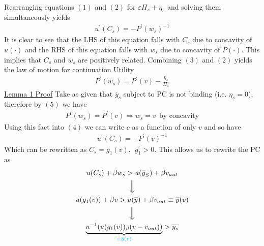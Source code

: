 \documentclass{article}
\begin{document}
\begin{itemize}
\begin{itemize}
\begin{itemize}
\begin{itemize}
\begin{align*}
                \end{align*}
                Rearranging equations $(1)$ and $(2)$ for $\varepsilon \Pi_{s} + \eta_{s}$ and solving them simultaneously yields
                \begin{align*}
                    u^{'}(C_{s}) = - P^{'}(w_{s})^{-1} \tag{(4)}
                \end{align*}
                It is clear to see that the LHS of this equation falls with $C_{s}$ due to concavity of $u(\cdot)$ and the RHS of this equation falls with $w_{s}$ due to concavity of $P(\cdot)$. This implies that $C_{s}$ and $w_{s}$ are positively related.
                \newline
                Combining $(3)$ and $(2)$ yields the law of motion for continuation Utility
                \begin{align*}
                    P^{'}(w_{s}) = P^{'}(v) - \frac{\eta_{s}}{\Pi_{s}} \tag{(5)}
                \end{align*}
                \newline
                \underline{Lemma 1 Proof}
                \newline
                Take as given that $\overline{y}_{s}$ subject to PC is not binding (i.e. $\eta_{s} = 0$), therefore by $(5)$ we have
                \begin{gather*}
                    P^{'}(w_{s}) = P^{'}(v) \Rightarrow w_{s} = v \ \ \text{by concavity}
                \end{gather*}
                Using this fact into $(4)$ we can write $c$ as a function of only $v$ and so have
                \begin{gather*}
                    u^{'}(C_{s}) = -P^{'} (v)^{-1}
                \end{gather*}
                Which can be rewritten as $C_{s} = g_{1}(v), \ \ g_{1}^{'} > 0$. This allows us to rewrite the PC as
                \begin{gather*}
                    u(C_{s}) + \beta w_{s} > u(\overline{y}_{S}) + \beta v_{aut} \\
                    \Big\Downarrow \\
                    u(g_{1}(v)) + \beta v > u(\overline{y}) + \beta v_{aut} \equiv \overline{y}(v) \\
                    \Big\Downarrow \\
                    \underbrace{u^{-1} (u(g_{1}(v)) _ \beta (v-v_{aut}))}_{\begingroup\color{cyan} \equiv \overline{y}(v) \endgroup} > \overline{y_{s}}

\end{gather*}
\end{itemize}
\end{itemize}
\end{itemize}
\end{itemize}
\end{document}
